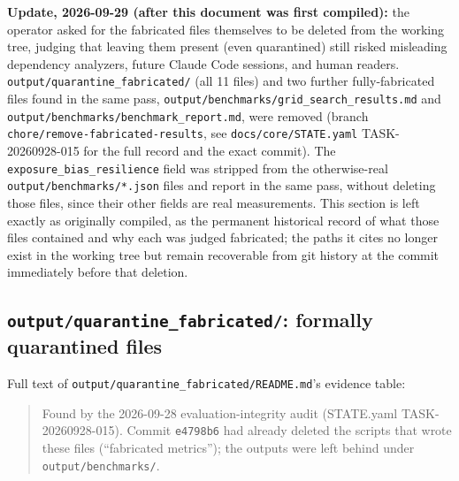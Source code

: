 \documentclass[11pt]{article}
\newcommand{\srcpath}[1]{\texttt{\small #1}}
\begin{document}
\textbf{Update, 2026-09-29 (after this document was first compiled):} the operator asked for the
fabricated files themselves to be deleted from the working tree, judging that leaving them present
(even quarantined) still risked misleading dependency analyzers, future Claude Code sessions, and
human readers. \srcpath{output/quarantine\_fabricated/} (all 11 files) and two further
fully-fabricated files found in the same pass, \srcpath{output/benchmarks/grid\_search\_results.md}
and \srcpath{output/benchmarks/benchmark\_report.md}, were removed (branch
\texttt{chore/remove-fabricated-results}, see \srcpath{docs/core/STATE.yaml} TASK-20260928-015 for
the full record and the exact commit). The \texttt{exposure\_bias\_resilience} field was stripped
from the otherwise-real \srcpath{output/benchmarks/*.json} files and report in the same pass,
without deleting those files, since their other fields are real measurements. This section is left
exactly as originally compiled, as the permanent historical record of what those files contained and
why each was judged fabricated; the paths it cites no longer exist in the working tree but remain
recoverable from git history at the commit immediately before that deletion.

\subsection{\texttt{output/quarantine\_fabricated/}: formally quarantined files}

Full text of \srcpath{output/quarantine\_fabricated/README.md}'s evidence table:

\begin{quote}\small
Found by the 2026-09-28 evaluation-integrity audit (STATE.yaml TASK-20260928-015). Commit
\texttt{e4798b6} had already deleted the scripts that wrote these files (``fabricated metrics'');
the outputs were left behind under \texttt{output/benchmarks/}.
\end{quote}
\end{document}
